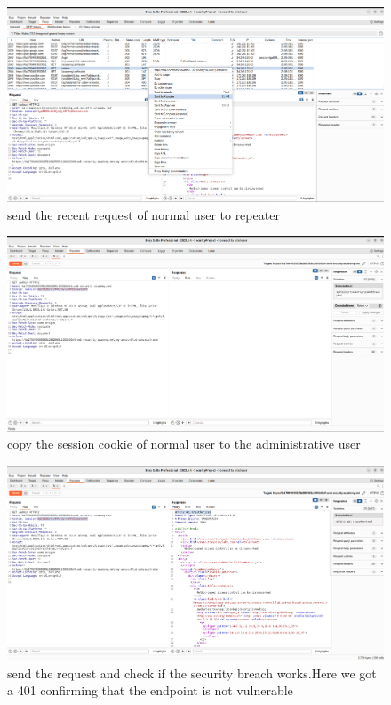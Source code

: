\documentclass[
	a4paper, %
	12pt, %
]{CSSullivanBusinessReport}
\begin{document}
\begin{fullwidth}
\begin{fullwidth}
\begin{figure}[H]
    \centering
    \includegraphics[width=1\textwidth]{Images/anikaScreensots/prev3.png}
    \caption{send the recent request of normal user to repeater}
    \label{fig:enter-label}
\end{figure}

\begin{figure}[H]
    \centering
    \includegraphics[width=1\textwidth]{Images/anikaScreensots/prev4.png}
    \caption{copy the session cookie of normal user to the administrative user}
    \label{fig:enter-label}
\end{figure}


\begin{figure}[H]
    \centering
    \includegraphics[width=1\textwidth]{Images/anikaScreensots/prev5.png}
    \caption{send the request and check if the security breach works.Here we got a 401 confirming that the endpoint is not vulnerable}
    \label{fig:enter-label}
\end{figure}


\end{fullwidth}
\end{fullwidth}
\end{document}
